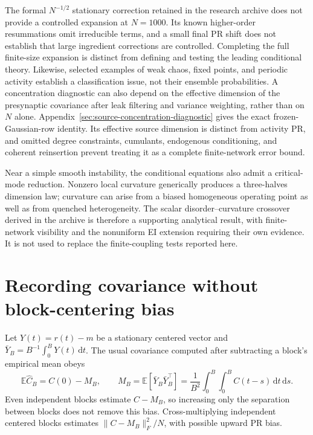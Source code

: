 \documentclass[11pt]{article}
\newcommand{\E}{\mathbb E}
\newcommand{\dd}{\,\mathrm d}
\begin{document}
The formal $N^{-1/2}$ stationary correction retained in the research archive
does not provide a controlled expansion at $N=1000$. Its known higher-order
resummations omit irreducible terms, and a small final PR shift does not
establish that large ingredient corrections are controlled. Completing the
full finite-size expansion is distinct from defining and testing the leading
conditional theory. Likewise, selected examples of weak chaos, fixed points,
and periodic activity establish a classification issue, not their ensemble
probabilities.
A concentration diagnostic can also depend on the effective dimension of
the presynaptic covariance after leak filtering and variance weighting,
rather than on $N$ alone. Appendix~\ref{sec:source-concentration-diagnostic}
gives the exact frozen-Gaussian-row identity. Its effective source dimension
is distinct from activity PR, and omitted degree constraints, cumulants,
endogenous conditioning, and coherent reinsertion prevent treating it as a
complete finite-network error bound.

Near a simple smooth instability, the conditional equations also admit a
critical-mode reduction. Nonzero local curvature generically produces a
three-halves dimension law; curvature can arise from a biased homogeneous
operating point as well as from quenched heterogeneity. The scalar
disorder--curvature crossover derived in the archive is therefore a
supporting analytical result, with finite-network visibility and the
nonuniform EI extension requiring their own evidence. It is not used to
replace the finite-coupling tests reported here.

\clearpage
\appendix


\section{Recording covariance without block-centering bias}
\label{app:recording}

Let $Y(t)=r(t)-m$ be a stationary centered vector and
$\bar Y_B=B^{-1}\int_0^B Y(t)\dd t$. The usual covariance computed after
subtracting a block's empirical mean obeys
\begin{equation}
 \E\widehat C_B=C(0)-M_B,\qquad
 M_B=\E[\bar Y_B\bar Y_B^\top]
 =\frac{1}{B^2}\int_0^B\!\int_0^B C(t-s)\dd t\dd s.
 \label{eq:centering}
\end{equation}
Even independent blocks estimate $C-M_B$, so increasing only the separation
between blocks does not remove this bias. Cross-multiplying independent
centered blocks estimates $\|C-M_B\|_F^2/N$, with possible upward PR bias.
\end{document}
